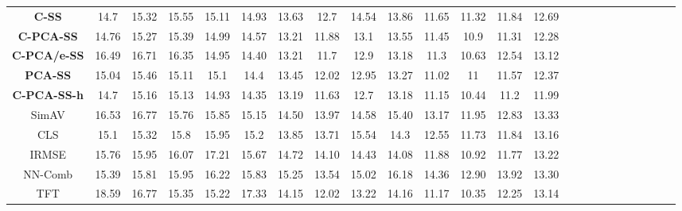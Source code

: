 \documentclass{article}
\begin{document}
\begin{table}
{\begin{tabular}{c c c c c c c c c c c c c c c c c c c c c c c c}
\cellcolor{gray!30} \textbf{C-SS} & \cellcolor{gray!30} 14.7 & \cellcolor{gray!30} 15.32 & \cellcolor{gray!30} 15.55 & \cellcolor{gray!30} 15.11 & \cellcolor{gray!30} 14.93 & \cellcolor{gray!30} 13.63 & \cellcolor{gray!30} 12.7 & \cellcolor{gray!30} 14.54 & \cellcolor{gray!30} 13.86 & \cellcolor{gray!30} 11.65 & \cellcolor{gray!30} 11.32 & \cellcolor{gray!30} 11.84 & \cellcolor{gray!30} 12.69 \\
\cellcolor{gray!30} \textbf{C-PCA-SS} & \cellcolor{gray!30} 14.76 & \cellcolor{gray!30} 15.27 & \cellcolor{gray!30} 15.39 & \cellcolor{gray!30} 14.99 & \cellcolor{gray!30} 14.57 & \cellcolor{gray!30} 13.21 & \cellcolor{gray!30} 11.88 & \cellcolor{gray!30} 13.1 & \cellcolor{gray!30} 13.55 & \cellcolor{gray!30} 11.45 & \cellcolor{gray!30} 10.9 & \cellcolor{gray!30} 11.31 & \cellcolor{gray!30} 12.28 \\

\cellcolor{gray!30} \textbf{C-PCA/e-SS} & \cellcolor{gray!30} 16.49 & \cellcolor{gray!30} 16.71 & \cellcolor{gray!30} 16.35 & \cellcolor{gray!30} 14.95 & \cellcolor{gray!30} 14.40 & \cellcolor{gray!30} 13.21 & \cellcolor{gray!30} 11.7 & \cellcolor{gray!30} 12.9 & \cellcolor{gray!30} 13.18 & \cellcolor{gray!30} 11.3 & \cellcolor{gray!30} 10.63 & \cellcolor{gray!30} 12.54 & \cellcolor{gray!30} 13.12\\
\cellcolor{gray!30} \textbf{PCA-SS} & \cellcolor{gray!30} 15.04 & \cellcolor{gray!30} 15.46 & \cellcolor{gray!30} 15.11 & \cellcolor{gray!30} 15.1 & \cellcolor{gray!30} 14.4 & \cellcolor{gray!30} 13.45 & \cellcolor{gray!30} 12.02 & \cellcolor{gray!30} 12.95 & \cellcolor{gray!30} 13.27 & \cellcolor{gray!30} 11.02 & \cellcolor{gray!30} 11 & \cellcolor{gray!30} 11.57 & \cellcolor{gray!30} 12.37\\
\cellcolor{gray!30} \textbf{C-PCA-SS-h} & \cellcolor{gray!30} 14.7 & \cellcolor{gray!30} 15.16 & \cellcolor{gray!30} 15.13 & \cellcolor{gray!30} 14.93 & \cellcolor{gray!30} 14.35 & \cellcolor{gray!30} 13.19 & \cellcolor{gray!30} 11.63 & \cellcolor{gray!30} 12.7 & \cellcolor{gray!30} 13.18 & \cellcolor{gray!30} 11.15 & \cellcolor{gray!30} 10.44 & \cellcolor{gray!30} 11.2 & \cellcolor{gray!30} 11.99 \\
SimAV & 16.53 & 16.77 & 15.76 & 15.85 & 15.15 & 14.50 & 13.97 & 14.58 & 15.40 & 13.17 & 11.95 & 12.83 & 13.33 \\
CLS & 15.1 & 15.32 & 15.8 & 15.95 & 15.2 & 13.85 & 13.71 & 15.54 & 14.3 & 12.55 & 11.73 & 11.84 & 13.16 \\
IRMSE & 15.76 & 15.95 & 16.07 & 17.21 & 15.67 & 14.72 & 14.10 & 14.43 & 14.08 & 11.88 & 10.92 & 11.77 & 13.22 \\
NN-Comb & 15.39 & 15.81 & 15.95 & 16.22 & 15.83 & 15.25 & 13.54 & 15.02 & 16.18 & 14.36 & 12.90 & 13.92 & 13.30 \\
TFT & 18.59 & 16.77 & 15.35 & 15.22 & 17.33 & 14.15 & 12.02 & 13.22 & 14.16 & 11.17 & 10.35 & 12.25 & 13.14 \\
\bottomrule
\end{tabular}
}
\end{table}
\end{document}
